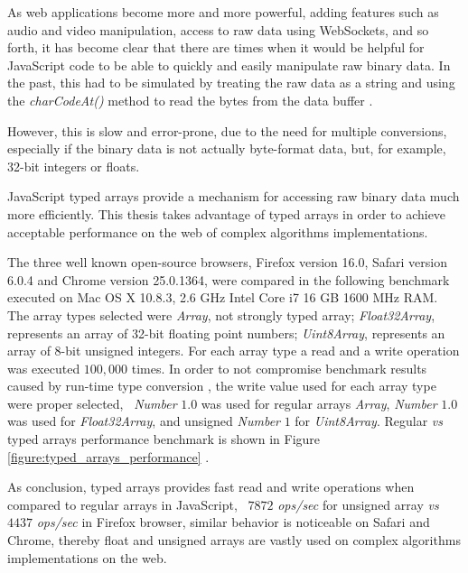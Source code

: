 As web applications become more and more powerful, adding features such as audio and video manipulation, access to raw data using WebSockets, and so forth, it has become clear that there are times when it would be helpful for JavaScript code to be able to quickly and easily manipulate raw binary data. In the past, this had to be simulated by treating the raw data as a string and using the \textit{charCodeAt()} method to read the bytes from the data buffer \cite{MDN2013} \cite{TypedArray2013}.

However, this is slow and error-prone, due to the need for multiple conversions, especially if the binary data is not actually byte-format data, but, for example, 32-bit integers or floats.

JavaScript typed arrays provide a mechanism for accessing raw binary data much more efficiently. This thesis takes advantage of typed arrays in order to achieve acceptable performance on the web of complex algorithms implementations.

The three well known open-source browsers, Firefox version 16.0, Safari version 6.0.4 and Chrome version 25.0.1364, were compared in the following benchmark executed on Mac OS X 10.8.3, 2.6 GHz Intel Core i7 16 GB 1600 MHz RAM. The array types selected were \textit{Array}, not strongly typed array; \textit{Float32Array}, represents an array of 32-bit floating point numbers; \textit{Uint8Array}, represents an array of 8-bit unsigned integers. For each array type a read and a write operation was executed $100,000$ times. In order to not compromise benchmark results caused by run-time type conversion \cite{International2009}, the write value used for each array type were proper selected, \eg\ \textit{Number} $1.0$ was used for regular arrays \textit{Array}, \textit{Number} $1.0$ was used for \textit{Float32Array}, and unsigned \textit{Number} $1$ for \textit{Uint8Array}. Regular \textit{vs} typed arrays performance benchmark is shown in Figure \ref{figure:typed_arrays_performance} \cite{TypedArrayPerformance2013}.

As conclusion, typed arrays provides fast read and write operations when compared to regular arrays in JavaScript, \ie\ $7872$ \textit{ops/sec} for unsigned array \textit{vs} $4437$ \textit{ops/sec} in Firefox browser, similar behavior is noticeable on Safari and Chrome, thereby float and unsigned arrays are vastly used on complex algorithms implementations on the web.

